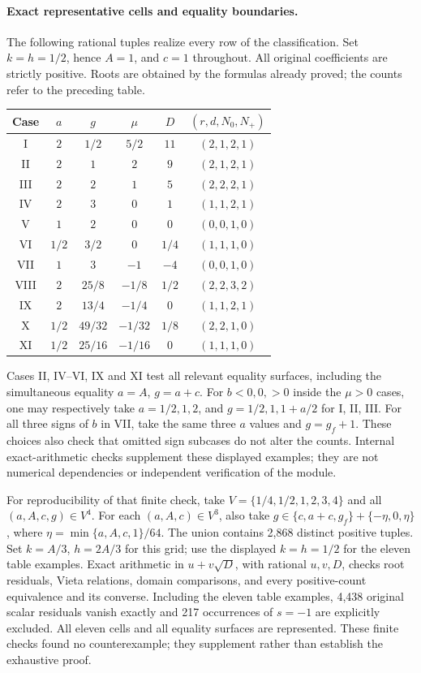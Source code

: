 \paragraph{Exact representative cells and equality boundaries.}
The following rational tuples realize every row of the classification.
Set $k=h=1/2$, hence $A=1$, and $c=1$ throughout.
All original coefficients are strictly positive. Roots are obtained
by the formulas already proved; the counts refer to the preceding table.
\begin{center}
\small
\renewcommand{\arraystretch}{1.12}
\begin{tabular}{@{}c c c c c c@{}}
\toprule
Case & $a$ & $g$ & $\mu$ & $D$ & $(r,d,N_0,N_+)$\\
\midrule
I & $2$ & $1/2$ & $5/2$ & $11$ & $(2,1,2,1)$\\
II & $2$ & $1$ & $2$ & $9$ & $(2,1,2,1)$\\
III & $2$ & $2$ & $1$ & $5$ & $(2,2,2,1)$\\
IV & $2$ & $3$ & $0$ & $1$ & $(1,1,2,1)$\\
V & $1$ & $2$ & $0$ & $0$ & $(0,0,1,0)$\\
VI & $1/2$ & $3/2$ & $0$ & $1/4$ & $(1,1,1,0)$\\
VII & $1$ & $3$ & $-1$ & $-4$ & $(0,0,1,0)$\\
VIII & $2$ & $25/8$ & $-1/8$ & $1/2$ & $(2,2,3,2)$\\
IX & $2$ & $13/4$ & $-1/4$ & $0$ & $(1,1,2,1)$\\
X & $1/2$ & $49/32$ & $-1/32$ & $1/8$ & $(2,2,1,0)$\\
XI & $1/2$ & $25/16$ & $-1/16$ & $0$ & $(1,1,1,0)$\\
\bottomrule
\end{tabular}
\end{center}
Cases II, IV--VI, IX and XI test all relevant equality surfaces,
including the simultaneous equality $a=A$, $g=a+c$.
For $b<0,0,>0$ inside the $\mu>0$ cases, one may respectively
take $a=1/2,1,2$, and $g=1/2,1,1+a/2$ for I, II, III.
For all three signs of $b$ in VII, take the same three $a$ values
and $g=g_f+1$. These choices also check that omitted sign subcases
do not alter the counts. Internal exact-arithmetic checks supplement
these displayed examples; they are not numerical dependencies or
independent verification of the module.

For reproducibility of that finite check, take
$V=\{1/4,1/2,1,2,3,4\}$ and all $(a,A,c,g)\in V^4$.
For each $(a,A,c)\in V^3$, also take
$g\in\{c,a+c,g_f\}+\{-\eta,0,\eta\}$, where
$\eta=\min\{a,A,c,1\}/64$. The union contains 2,868 distinct
positive tuples. Set $k=A/3$, $h=2A/3$ for this grid; use the
displayed $k=h=1/2$ for the eleven table examples. Exact arithmetic
in $u+v\sqrt D$, with rational $u,v,D$, checks root residuals,
Vieta relations, domain comparisons, and every positive-count
equivalence and its converse. Including the eleven table examples,
4,438 original scalar residuals vanish exactly and 217 occurrences
of $s=-1$ are explicitly excluded. All eleven cells and all equality
surfaces are represented. These finite checks found no counterexample;
they supplement rather than establish the exhaustive proof.

